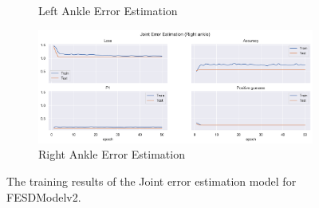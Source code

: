 \begin{figure}[!ht]
\begin{subfigure}[b]{0.47\linewidth}
        \caption{Left Ankle Error Estimation}
        \label{fig:v2_lean_jt_ee}
    \end{subfigure}
    \hfill
    \begin{subfigure}[b]{0.47\linewidth}
        \centering
        \includegraphics[width=\textwidth]{figures/Results/v2/jt/Right ankle_ErrorEstimation.png}
        \caption{Right Ankle Error Estimation}
        \label{fig:v2_rian_jt_ee}
    \end{subfigure}
    \caption[Detailed Training results for FESDModelv2]{The training results of the Joint error estimation model for FESDModelv2.}
  \end{figure}